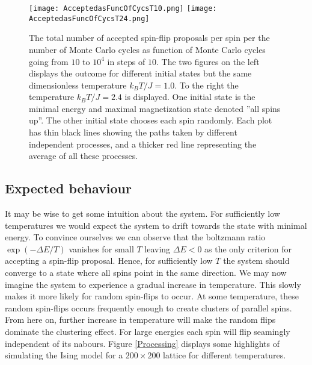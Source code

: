 \documentclass[twoside,utf8]{article}
\begin{document}
\begin{figure}[H]
\begin{center}
\texttt{[image: AcceptedasFuncOfCycsT10.png]}
\texttt{[image: AcceptedasFuncOfCycsT24.png]}
\end{center}
\caption{
The total number of accepted spin-flip proposals per spin per the number of Monte Carlo cycles as function of Monte Carlo cycles going from $10$ to $10^4$ in steps of $10$. The two figures on the left displays the outcome for different initial states but the same dimensionless temperature $k_B T/J=1.0$. To the right the temperature $k_B T/J=2.4$ is displayed. One initial state is the minimal energy and maximal magnetization state denoted ''all spins up''. The other initial state chooses each spin randomly. Each plot has thin black lines showing the paths taken by different independent processes, and a thicker red line representing the average of all these processes.  
}
\label{AccCycs}
\end{figure}






\subsection{Expected behaviour}
\noindent
It may be wise to get some intuition about the system. For sufficiently low temperatures we would expect the system to drift towards the state with minimal energy. To convince ourselves we can observe that the boltzmann ratio $\exp\left(-\Delta E/T\right)$ vanishes for small $T$ leaving $\Delta E<0$ as the only criterion for accepting a spin-flip proposal. Hence, for sufficiently low $T$ the system should converge to a state where all spins point in the same direction. We may now imagine the system to experience a gradual increase in temperature. This slowly makes it more likely for random spin-flips to occur. At some temperature, these random spin-flips occurs frequently enough to create clusters of parallel spins. From here on, further increase in temperature will make the random flips dominate the clustering effect. For large energies each spin will flip seamingly independent of its nabours. Figure \ref*{Processing} displays some highlights of simulating the Ising model for a $200\times 200$ lattice for different temperatures.
\end{document}
